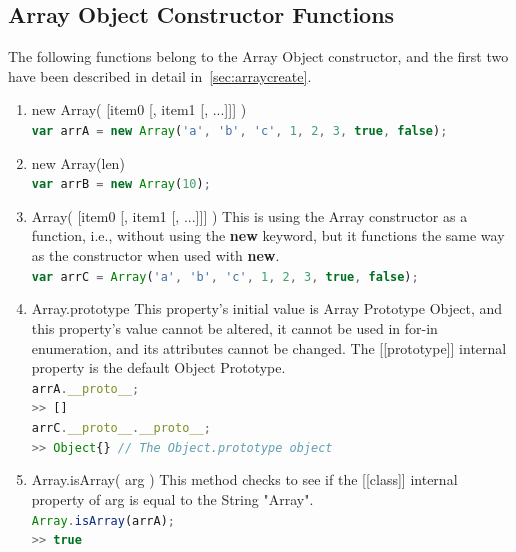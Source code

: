 \documentclass[a4paper,11pt,twoside]{report}
\def\jsinline{\lstinline[language=JavaScript, basicstyle=\small]}%\end{lstlisting}
\begin{document}
\subsection{Array Object Constructor Functions}
The following functions belong to the Array Object constructor, and the first two have been described in detail in~\ref{sec:arraycreate}.
\begin{enumerate}
\item new Array( [item0 [, item1 [, ...]]] )\\
\jsinline|var arrA = new Array('a', 'b', 'c', 1, 2, 3, true, false);|
\item new Array(len)\\
\jsinline|var arrB = new Array(10);|
\item Array( [item0 [, item1 [, ...]]] ) \newline
This is using the Array constructor as a function, i.e., without using the \textbf{new} keyword, but it functions the same way as the constructor when used with \textbf{new}.\\
\jsinline|var arrC = Array('a', 'b', 'c', 1, 2, 3, true, false);|
\item Array.prototype \newline
This property's initial value is Array Prototype Object, and this property's value cannot be altered, it cannot be used in for-in enumeration, and its attributes cannot be changed. The [[prototype]] internal property is the default Object Prototype.\\
\jsinline|arrA.__proto__;|\\
\jsinline|>> []|\\
\jsinline|arrC.__proto__.__proto__;| \\
\jsinline|>> Object{} // The Object.prototype object|
\item Array.isArray( arg ) \newline
This method checks to see if the [[class]] internal property of arg is equal to the String "Array". \\
\jsinline|Array.isArray(arrA);| \\
\jsinline|>> true|
\end{enumerate}
\end{document}
